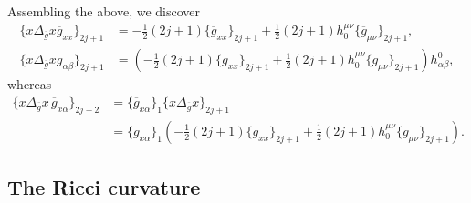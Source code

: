 \documentclass[pdftex]{sigma}
\numberwithin{equation}{section}
\newcommand{\olg}{\overline{g}}
\newcommand{\gbar}{\overline{g}}
\begin{document}
Assembling the above, we discover
\begin{align} \label{eqn:laplacian-asymp-xx}
\{ x \Delta_{\olg} x \gbar_{xx} \}_{2j+1} &= -\frac{1}{2} (2j+1) \{\olg_{xx}\}_{2j+1} +\frac{1}{2} (2j+1) h_0^{\mu\nu}\{\olg_{\mu\nu}\}_{2j+1}, \\
\{ x \Delta_{\olg} x \gbar_{\alpha \beta} \}_{2j+1} &= \left(-\frac{1}{2} (2j+1) \{\olg_{xx}\}_{2j+1} +\frac{1}{2} (2j+1) h_0^{\mu \nu}\{\olg_{\mu\nu}\}_{2j+1} \right)h^0_{\alpha \beta},\label{eqn:laplacian-asymp-ab}
\end{align}
whereas
\begin{align}
\{ x \Delta_{\olg} x \, \gbar_{x \alpha} \}_{2j+2} &= \{ \olg_{x \alpha}\}_1 \{ x \Delta_{\olg} x\}_{2j+1} \nonumber\\
&= \{ \olg_{x \alpha}\}_1 \left( -\frac{1}{2} (2j+1) \{\olg_{xx}\}_{2j+1} +\frac{1}{2} (2j+1) h_0^{\mu \nu}\{\olg_{\mu \nu}\}_{2j+1}\right). \label{eqn:mixed-ref-2}
\end{align}

\subsection*{The Ricci curvature}
\end{document}
